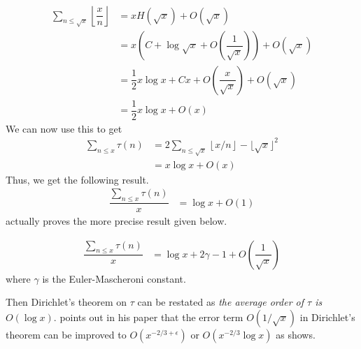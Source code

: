 \documentclass[elemannt.tex]{subfile}
\begin{document}
		\begin{align*}
			\sum_{n\leq \sqrt{x}}\left\lfloor{\dfrac{x}{n}}\right\rfloor
				& = xH(\sqrt{x})+O(\sqrt{x})\\
				& = x\left(C+\log{\sqrt{x}}+O\left(\dfrac{1}{\sqrt{x}}\right)\right)+O(\sqrt{x})\\
				& = \dfrac{1}{2}x\log{x}+Cx+O\left(\dfrac{x}{\sqrt{x}}\right)+O(\sqrt{x})\\
				& = \dfrac{1}{2}x\log{x}+O(x)
		\end{align*}
	We can now use this to get
		\begin{align*}
			\sum_{n\leq x}\tau(n)
				& = 2\sum_{n\leq \sqrt{x}}\left\lfloor{x/n}\right\rfloor-\lfloor{\sqrt{x}}\rfloor^{2}\\
				& = x\log{x}+O(x)
		\end{align*}
	Thus, we get the following result.
		\begin{align*}
			\dfrac{\sum_{n\leq x}\tau(n)}{x}
				& = \log{x}+O(1)
		\end{align*}
	\textcite{dirichlet_1897} actually proves the more precise result given below.
		\begin{theorem}\label{thm:dirtau}
				\begin{align*}
					\dfrac{\sum_{n\leq x}\tau(n)}{x}
						& = \log{x}+2\gamma-1+O\left(\dfrac{1}{\sqrt{x}}\right)
				\end{align*}
			where $\gamma$ is the Euler-Mascheroni constant.
		\end{theorem}
	Then Dirichlet's theorem on $\tau$ can be restated as \textit{the average order of $\tau$ is }$O(\log{x})$. \textcite{aiyangar_hardy_vennkatesvara_seshu_aiyar_p_wilson_1927} points out in his paper that the error term $O(1/\sqrt{x})$ in Dirichlet's theorem can be improved to $O\left(x^{-2/3+\epsilon}\right)$ or $O\left(x^{-2/3}\log{x}\right)$ as \textcite[Page $689$]{landau_1912} shows.
\end{document}
